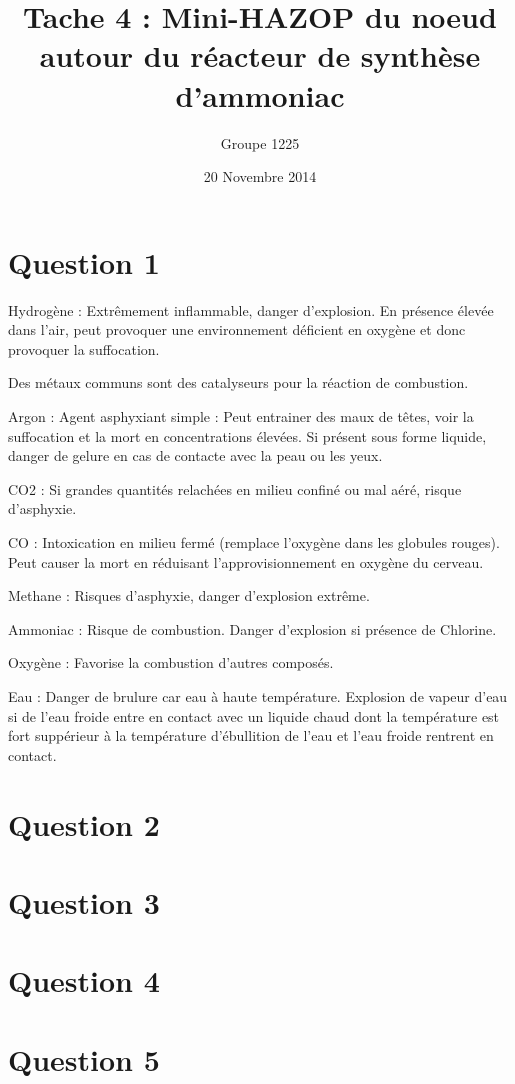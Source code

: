 \documentclass[a4paper,oneside,12pt]{article}
\title{Tache 4 : Mini-HAZOP du noeud autour du réacteur de synthèse d'ammoniac}
\author{Groupe 1225}
\date{20 Novembre 2014}
\begin{document}
\maketitle

\section*{Question 1}

Hydrogène : Extrêmement inflammable, danger d'explosion. En présence élevée dans l'air, peut provoquer une environnement déficient en oxygène et donc provoquer la suffocation. 

Des métaux communs sont des catalyseurs pour la réaction de combustion.

Argon : Agent asphyxiant simple : Peut entrainer des maux de têtes, voir la suffocation et la mort en concentrations élevées. Si présent sous forme liquide, danger de gelure en cas de contacte avec la peau ou les yeux.

CO2 : Si grandes quantités relachées en milieu confiné ou mal aéré, risque d'asphyxie.

CO : Intoxication en milieu fermé (remplace l'oxygène dans les globules rouges). Peut causer la mort en réduisant l'approvisionnement en oxygène du cerveau.

Methane : Risques d'asphyxie, danger d'explosion extrême.

Ammoniac : Risque de combustion. Danger d'explosion si présence de Chlorine.

Oxygène : Favorise la combustion d'autres composés.

Eau : Danger de brulure car eau à haute température. Explosion de vapeur d'eau si de l'eau froide entre en contact avec un liquide chaud dont la température est fort suppérieur à la température d'ébullition de l'eau et l'eau froide rentrent en contact.

\section*{Question 2}

\section*{Question 3}

\section*{Question 4}

\section*{Question 5}
\end{document}
